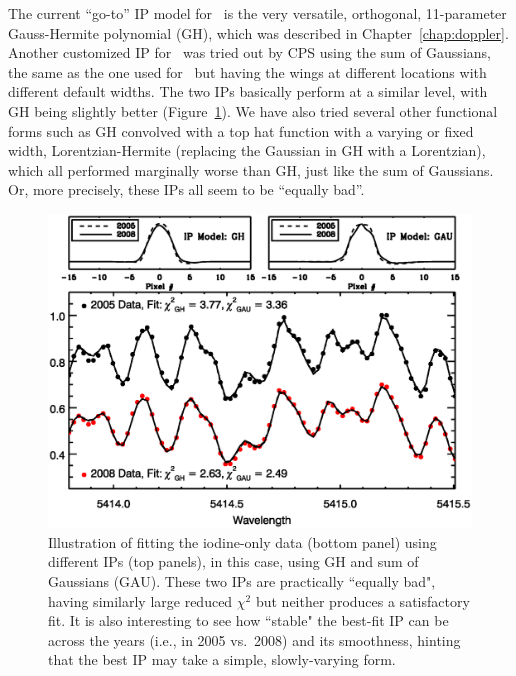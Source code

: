 The current ``go-to'' IP model for \hrs\ is the very versatile,
orthogonal, 11-parameter Gauss-Hermite polynomial (GH), which was
described in Chapter~\ref{chap:doppler}. Another customized IP for
\het\ was tried out by CPS using the sum of Gaussians, the same as
the one used for \keck\ but having the wings at different locations
with different default widths. The two IPs basically perform at a
similar level, with GH being slightly better
(Figure~\ref{het:fig:ghgau}). We have also tried several other
functional forms such as GH convolved with a top hat function with a
varying or fixed width, Lorentzian-Hermite (replacing the Gaussian in
GH with a Lorentzian), which all performed marginally worse than GH,
just like the sum of Gaussians. Or, more precisely, these IPs all seem
to be ``equally bad''.


\begin{figure}
\centering
\includegraphics[scale=0.45]{het/iodfit.eps}
\caption{Illustration of fitting the iodine-only data (bottom panel)
  using different IPs (top panels), in this case, using GH and sum of
  Gaussians (GAU). These two IPs are practically ``equally bad",
  having similarly large reduced $\chi^2$ but neither produces a
  satisfactory fit. It is also interesting to see how ``stable" the
  best-fit IP can be across the years (i.e., in 2005 vs.~2008) and its
  smoothness, hinting that the best IP may take a simple, slowly-varying form. 
\label{het:fig:ghgau}}
\end{figure}



